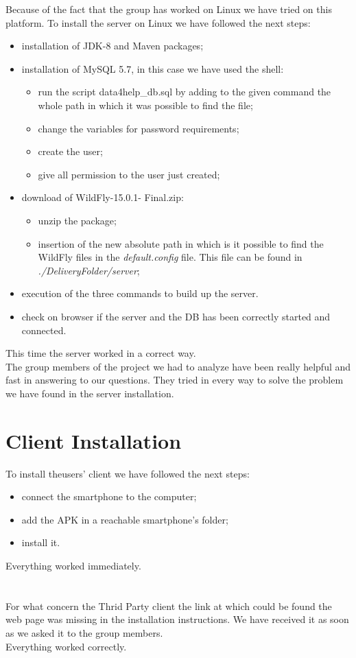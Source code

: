 Because of the fact that the group has worked on Linux we have tried on this platform. To install the server on Linux we have followed the next steps:
\begin{itemize}
	\item installation of JDK-8 and Maven packages;
	\item installation of MySQL 5.7, in this case we have used the shell:
		\begin{itemize}
			\item run the script data4help\_db.sql by adding to the given command the whole path in which it was possible 				to find the file;
			\item change the variables for password requirements;
			\item create the user;
			\item give all permission to the user just created; 
		\end{itemize}
	\item download of WildFly-15.0.1- Final.zip:
		\begin{itemize}
			\item unzip the package;
			\item insertion of the new absolute path in which is it possible to find the WildFly files in the \textit{default.config} 				file. This file can be found in \textit{./DeliveryFolder/server};
		\end{itemize}
	\item execution of the three commands to build up the server.
	\item check on browser if the server and the DB has been correctly started and connected.
\end{itemize}This time the server worked in a correct way. \\

The group members of the project we had to analyze have been really helpful and fast in answering to our questions. They tried in every way to solve the problem we have found in the server installation.\\ 

\section{Client Installation}
To install theusers' client we have followed the next steps:
\begin{itemize}
	\item connect the smartphone to the computer;
	\item add the APK in a reachable smartphone's folder;
	\item install it.
\end{itemize}Everything worked immediately.\\
\\
\\
For what concern the Thrid Party client the link at which could be found the web page was missing in the installation instructions. We have received it as soon as we asked it to the group members.\\ Everything worked correctly.